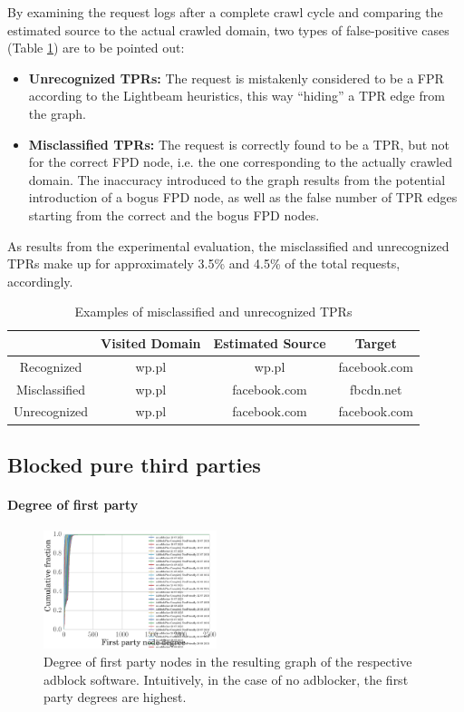 \documentclass{sig-alternate}
\begin{document}
By examining the request logs after a complete crawl cycle and comparing the estimated source to the actual crawled domain, two types of false-positive cases (Table \ref{table:false_positive_examples}) are to be pointed out:

\begin{itemize}
\item \textbf{Unrecognized TPRs:} The request is mistakenly considered to be a FPR according to the Lightbeam heuristics, this way ``hiding'' a TPR edge from the graph.
\item \textbf{Misclassified TPRs:} The request is correctly found to be a TPR, but not for the correct FPD node, i.e. the one corresponding to the actually crawled domain. The inaccuracy introduced to the graph results from the potential introduction of a bogus FPD node, as well as the false number of TPR edges starting from the correct and the bogus FPD nodes.
\end{itemize}

As results from the experimental evaluation, the misclassified and unrecognized TPRs make up for approximately 3.5\% and 4.5\% of the total requests, accordingly.

\begin{table}
\centering
\small
\begin{tabular}{|c|c c c|}
\hline
& Visited Domain & Estimated Source & Target \\
\hline
Recognized & wp.pl & wp.pl & facebook.com \\
Misclassified & wp.pl & facebook.com & fbcdn.net \\
Unrecognized & wp.pl & facebook.com & facebook.com \\
\hline
\end{tabular}
\label{table:false_positive_examples}
\caption{Examples of misclassified and unrecognized TPRs}
\end{table}

\subsection{Blocked pure third parties}

\paragraph{Degree of first party}
\begin{figure}[h]
  \centering
  \includegraphics[width=0.45\textwidth]{figures/degree_first_parties.eps}
  \caption{Degree of first party nodes in the resulting graph of the respective adblock software. Intuitively, in the case of no adblocker, the first party degrees are highest.}\label{fig:degree_first_parties}
\end{figure}
\end{document}
